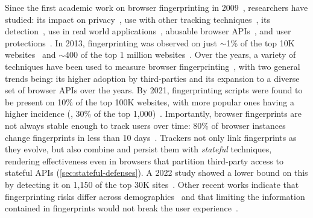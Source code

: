Since the first academic work on browser fingerprinting in 2009~\cite{mayerAnyPersonPamphleteer2009}, researchers have studied: its impact on privacy~\cite{eckersleyHowUniqueYour2010}, use with other tracking techniques~\cite{fouadMyCookiePhoenix2022}, its detection~\cite{iqbalFingerprintingFingerprintersLearning2021, boussahaFPtracerFinegrainedBrowser2024}, use in real world applications~\cite{aminazadWebRunner20492020, wuHimManyFaces2023}, abusable browser APIs~\cite{bahramiFPRadarLongitudinalMeasurement2022, suAutomaticDiscoveryEmerging2023, senolDoubleEdgedSword2024}, and user protections~\cite{vastelFpScannerPrivacyImplications2018}. 
%
In 2013, fingerprinting was observed on just $\sim$1\% of the top 10K websites~\cite{nikiforakisCookielessMonsterExploring2013} and $\sim$400 of the top 1 million websites~\cite{acarFPDetectiveDustingWeb2013}. 
%
Over the years, a variety of techniques have been used to measure browser fingerprinting~\cite{acarWebNeverForgets2014,englehardtOnlineTracking1millionsite2016,olejnikBatteryStatusNot2017,dasWebsSixthSense2018}, with two general trends being: its higher adoption by third-parties and its expansion to a diverse set of browser APIs over the years. 
%
By 2021, fingerprinting scripts were found to be present on 10\% of the top 100K websites, with more popular ones having a higher incidence (\ie{}, 30\% of the top 1,000)~\cite{iqbalFingerprintingFingerprintersLearning2021}.
%
Importantly, browser fingerprints are not always stable enough to track users over time: 80\% of browser instances change fingerprints in less than 10 days~\cite{vastelFPSTALKERTrackingBrowser2018}. 
%
Trackers not only link fingerprints as they evolve, but also combine and persist them with \textit{stateful} techniques, rendering effectiveness even in browsers that partition third-party access to stateful APIs (\autoref{sec:stateful-defenses}). 
%
A 2022 study showed a lower bound on this by detecting it on 1,150 of the top 30K sites~\cite{fouadMyCookiePhoenix2022}.
%
Other recent works indicate that fingerprinting risks differ across demographics~\cite{berkeHowUniqueWhose2025} and that limiting the information contained in fingerprints would not break the user experience~\cite{intumwayaseUARadarExploringImpact2023}.


